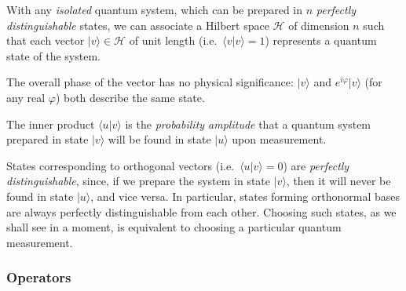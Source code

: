 \documentclass[fleqn]{article}
\newenvironment{idea}{\noindent}{\medskip}
\begin{document}
\begin{idea}

With any \emph{isolated} quantum system, which can be prepared in \(n\) \emph{perfectly distinguishable} states, we can associate a Hilbert space \(\mathcal{H}\) of dimension \(n\) such that each vector \(|v\rangle\in\mathcal{H}\) of unit length (i.e.~\(\langle v|v\rangle =1\)) represents a quantum state of the system.

The overall phase of the vector has no physical significance: \(|v\rangle\) and \(e^{i\varphi}|v\rangle\) (for any real \(\varphi\)) both describe the same state.

The inner product \(\langle u|v\rangle\) is the \emph{probability amplitude} that a quantum system prepared in state \(|v\rangle\) will be found in state \(|u\rangle\) upon measurement.

States corresponding to orthogonal vectors (i.e.~\(\langle u|v\rangle=0\)) are \emph{perfectly distinguishable}, since, if we prepare the system in state \(|v\rangle\), then it will never be found in state \(|u\rangle\), and vice versa.
In particular, states forming orthonormal bases are always perfectly distinguishable from each other.
Choosing such states, as we shall see in a moment, is equivalent to choosing a particular quantum measurement.

\end{idea}

\hypertarget{operators}{%
\subsubsection{Operators}\label{operators}}
\end{document}
